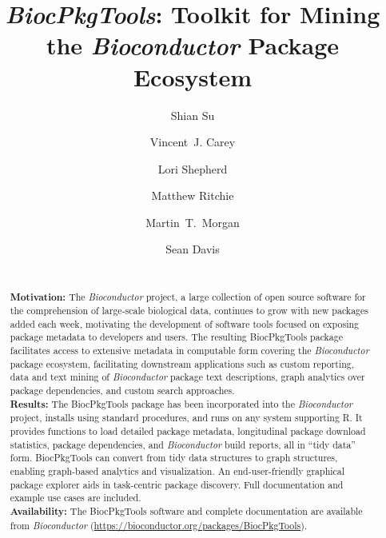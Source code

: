 \documentclass[9pt,a4paper]{extarticle}\usepackage[]{graphicx}\usepackage[]{color}
\begin{document}
\pagestyle{front}

\title{\textit{BiocPkgTools}: Toolkit for Mining the \emph{Bioconductor} Package Ecosystem}

\author[1]{Shian Su}
\author[2]{Vincent~J. Carey}
\author[3]{Lori Shepherd}
\author[1]{Matthew Ritchie}
\author[3]{\mbox{Martin~T. Morgan}}
\author[4]{Sean Davis}

\maketitle
\thispagestyle{front}


\begin{abstract}
  \\ \textbf{Motivation:} The \emph{Bioconductor} project, a large
  collection of open source software for the comprehension of
  large-scale biological data, continues to grow with new packages
  added each week, motivating the development of software tools
  focused on exposing package metadata to developers and users. The
  resulting BiocPkgTools package facilitates access to extensive
  metadata in computable form covering the \emph{Bioconductor} package
  ecosystem, facilitating downstream applications such as custom
  reporting, data and text mining of \emph{Bioconductor} package text
  descriptions, graph analytics over package
  dependencies, and custom search approaches. \\
  \textbf{Results:} The BiocPkgTools package has been incorporated
  into the \emph{Bioconductor} project, installs using standard
  procedures, and runs on any system supporting R. It provides
  functions to load detailed package metadata, longitudinal package
  download statistics, package dependencies, and \emph{Bioconductor}
  build reports, all in ``tidy data'' form. BiocPkgTools can convert
  from tidy data structures to graph structures, enabling graph-based
  analytics and visualization. An end-user-friendly graphical package
  explorer aids in task-centric package discovery. Full documentation
  and example use cases are included. \\ \textbf{Availability:} The
  BiocPkgTools software and complete documentation are available from
  \emph{Bioconductor}
  (\href{https://bioconductor.org/packages/BiocPkgTools}{https://bioconductor.org/packages/BiocPkgTools}).
\end{abstract}
\end{document}

